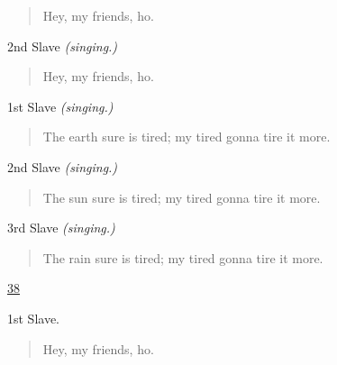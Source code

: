 \documentclass[letterpaper,article,12pt,oneside,notitlepage]{memoir}
\begin{document}
\begin{verse}
\hspace{1cm} Hey, my friends, ho. \\
\end{verse}

\begin{center}2nd Slave \textit{(singing.)}\end{center}

\begin{verse}
\hspace{1cm} Hey, my friends, ho. \\
\end{verse}

\begin{center}1st Slave \textit{(singing.)}\end{center}

\begin{verse}
\hspace{1cm} The earth sure is tired; my tired gonna tire it more. \\
\end{verse}

\begin{center}2nd Slave \textit{(singing.)}\end{center}

\begin{verse}
\hspace{1cm} The sun sure is tired; my tired gonna tire it more. \\
\end{verse}

\begin{center}3rd Slave \textit{(singing.)}\end{center}

\begin{verse}
\hspace{1cm} The rain sure is tired; my tired gonna tire it more. \\
\end{verse}

\clearpage

\href{http://cesaire.elotroalex.com/chiens/chiens/p038.html}{38}

\begin{center}1st Slave.\end{center}

\begin{verse}
\hspace{1cm}  Hey, my friends, ho. \\
\end{verse}
\end{document}
